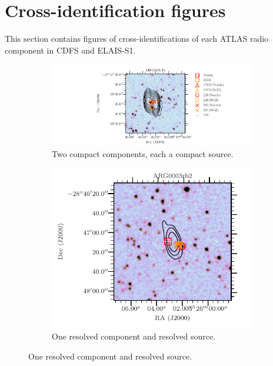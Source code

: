 \section{Cross-identification figures}\label{app:examples}

    This section contains figures of cross-identifications of each ATLAS radio component in CDFS and ELAIS-S1.


    \begin{figure}
        \centering
        \begin{subfigure}{0.45\textwidth}
            \includegraphics[width=\textwidth]{atlas-images/examples_all/example_sorted_0_306.pdf}
            \caption{Two compact components, each a compact source.}
        \end{subfigure}
        \begin{subfigure}{0.45\textwidth}
            \includegraphics[width=\textwidth]{atlas-images/examples_all/example_sorted_2_0.pdf}
            \caption{One resolved component and resolved source.}
        \end{subfigure}

\end{figure}
